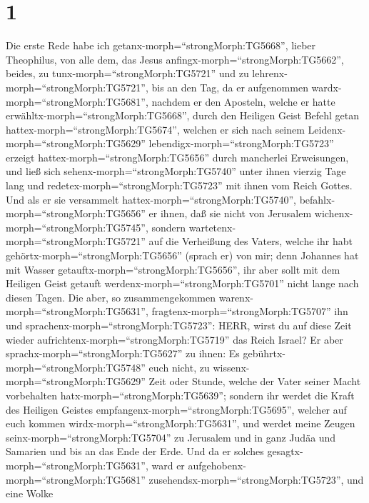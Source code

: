 \hypertarget{section}{%
\section{1}\label{section}}

 Die erste Rede habe ich
getanx-morph=``strongMorph:TG5668'', lieber Theophilus, von alle dem,
das Jesus anfingx-morph=``strongMorph:TG5662'', beides, zu
tunx-morph=``strongMorph:TG5721'' und zu
lehrenx-morph=``strongMorph:TG5721'',  bis an den Tag, da er
aufgenommen wardx-morph=``strongMorph:TG5681'', nachdem er den Aposteln,
welche er hatte erwähltx-morph=``strongMorph:TG5668'', durch den
Heiligen Geist Befehl getan hattex-morph=``strongMorph:TG5674'',
 welchen er sich nach seinem
Leidenx-morph=``strongMorph:TG5629''
lebendigx-morph=``strongMorph:TG5723'' erzeigt
hattex-morph=``strongMorph:TG5656'' durch mancherlei Erweisungen, und
ließ sich sehenx-morph=``strongMorph:TG5740'' unter ihnen vierzig Tage
lang und redetex-morph=``strongMorph:TG5723'' mit ihnen vom Reich
Gottes.  Und als er sie versammelt
hattex-morph=``strongMorph:TG5740'',
befahlx-morph=``strongMorph:TG5656'' er ihnen, daß sie nicht von
Jerusalem wichenx-morph=``strongMorph:TG5745'', sondern
wartetenx-morph=``strongMorph:TG5721'' auf die Verheißung des Vaters,
welche ihr habt gehörtx-morph=``strongMorph:TG5656'' (sprach er) von
mir;  denn Johannes hat mit Wasser
getauftx-morph=``strongMorph:TG5656'', ihr aber sollt mit dem Heiligen
Geist getauft werdenx-morph=``strongMorph:TG5701'' nicht lange nach
diesen Tagen.  Die aber, so zusammengekommen
warenx-morph=``strongMorph:TG5631'',
fragtenx-morph=``strongMorph:TG5707'' ihn und
sprachenx-morph=``strongMorph:TG5723'': HERR, wirst du auf diese Zeit
wieder aufrichtenx-morph=``strongMorph:TG5719'' das Reich Israel?
 Er aber sprachx-morph=``strongMorph:TG5627'' zu ihnen: Es
gebührtx-morph=``strongMorph:TG5748'' euch nicht, zu
wissenx-morph=``strongMorph:TG5629'' Zeit oder Stunde, welche der Vater
seiner Macht vorbehalten hatx-morph=``strongMorph:TG5639''; 
sondern ihr werdet die Kraft des Heiligen Geistes
empfangenx-morph=``strongMorph:TG5695'', welcher auf euch kommen
wirdx-morph=``strongMorph:TG5631'', und werdet meine Zeugen
seinx-morph=``strongMorph:TG5704'' zu Jerusalem und in ganz Judäa und
Samarien und bis an das Ende der Erde.  Und da er solches
gesagtx-morph=``strongMorph:TG5631'', ward er
aufgehobenx-morph=``strongMorph:TG5681''
zusehendsx-morph=``strongMorph:TG5723'', und eine Wolke
